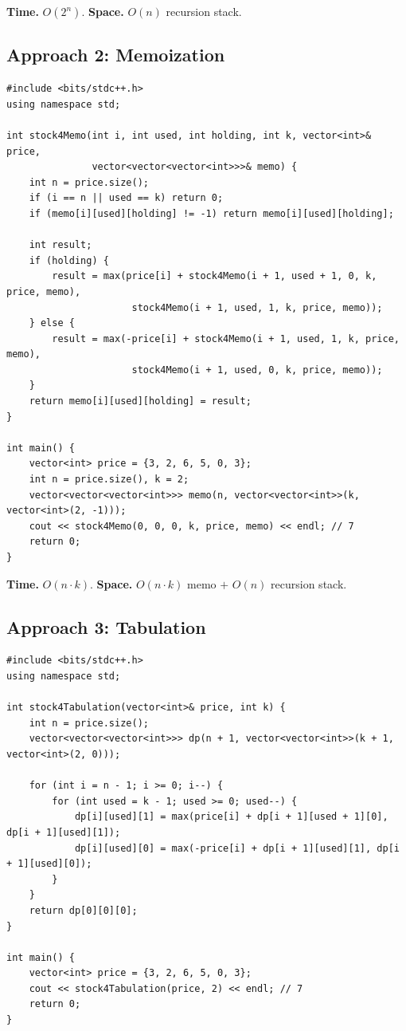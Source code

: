 \begin{complexitybox}
\textbf{Time.} $O(2^n)$.
\textbf{Space.} $O(n)$ recursion stack.
\end{complexitybox}

\subsection*{Approach 2: Memoization}

\begin{lstlisting}
#include <bits/stdc++.h>
using namespace std;

int stock4Memo(int i, int used, int holding, int k, vector<int>& price,
               vector<vector<vector<int>>>& memo) {
    int n = price.size();
    if (i == n || used == k) return 0;
    if (memo[i][used][holding] != -1) return memo[i][used][holding];

    int result;
    if (holding) {
        result = max(price[i] + stock4Memo(i + 1, used + 1, 0, k, price, memo),
                      stock4Memo(i + 1, used, 1, k, price, memo));
    } else {
        result = max(-price[i] + stock4Memo(i + 1, used, 1, k, price, memo),
                      stock4Memo(i + 1, used, 0, k, price, memo));
    }
    return memo[i][used][holding] = result;
}

int main() {
    vector<int> price = {3, 2, 6, 5, 0, 3};
    int n = price.size(), k = 2;
    vector<vector<vector<int>>> memo(n, vector<vector<int>>(k, vector<int>(2, -1)));
    cout << stock4Memo(0, 0, 0, k, price, memo) << endl; // 7
    return 0;
}
\end{lstlisting}

\begin{complexitybox}
\textbf{Time.} $O(n \cdot k)$.
\textbf{Space.} $O(n \cdot k)$ memo $+$ $O(n)$ recursion stack.
\end{complexitybox}

\subsection*{Approach 3: Tabulation}

\begin{lstlisting}
#include <bits/stdc++.h>
using namespace std;

int stock4Tabulation(vector<int>& price, int k) {
    int n = price.size();
    vector<vector<vector<int>>> dp(n + 1, vector<vector<int>>(k + 1, vector<int>(2, 0)));

    for (int i = n - 1; i >= 0; i--) {
        for (int used = k - 1; used >= 0; used--) {
            dp[i][used][1] = max(price[i] + dp[i + 1][used + 1][0], dp[i + 1][used][1]);
            dp[i][used][0] = max(-price[i] + dp[i + 1][used][1], dp[i + 1][used][0]);
        }
    }
    return dp[0][0][0];
}

int main() {
    vector<int> price = {3, 2, 6, 5, 0, 3};
    cout << stock4Tabulation(price, 2) << endl; // 7
    return 0;
}
\end{lstlisting}

